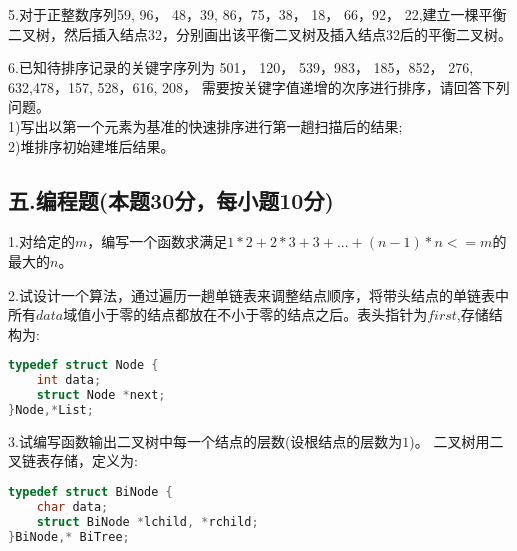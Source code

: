 5.对于正整数序列{59, 96， 48，39, 86，75，38， 18， 66，92， 22},建立一棵平衡二叉树，然后插入结点32，分别画出该平衡二叉树及插入结点32后的平衡二叉树。

6.已知待排序记录的关键字序列为{ 501， 120， 539，983， 185，852， 276, 632,478，157, 528，616, 208}， 需要按关键字值递增的次序进行排序，请回答下列问题。 \\
1)写出以第一个元素为基准的快速排序进行第一趟扫描后的结果; \\
2)堆排序初始建堆后结果。

\subsection{五.编程题(本题30分，每小题10分)}

1.对给定的$m$，编写一个函数求满足$1*2+2*3+3+...+(n-1)*n<=m$的最大的$n$。

2.试设计一个算法，通过遍历一趟单链表来调整结点顺序，将带头结点的单链表中所有$data$域值小于零的结点都放在不小于零的结点之后。表头指针为$first$,存储结构为:
\begin{lstlisting}[language=cpp]
typedef struct Node {
    int data;
    struct Node *next;
}Node,*List;
\end{lstlisting}

3.试编写函数输出二叉树中每一个结点的层数(设根结点的层数为$1$)。 二叉树用二叉链表存储，定义为:
\begin{lstlisting}[language=cpp]
typedef struct BiNode {
    char data; 
    struct BiNode *lchild, *rchild;
}BiNode,* BiTree;
\end{lstlisting}
